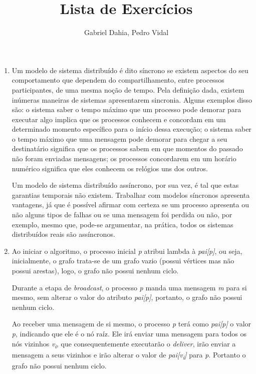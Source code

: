 \documentclass{article}
\title{Lista de Exercícios}
\author{Gabriel Dahia, Pedro Vidal}
\begin{document}
 
\maketitle
 
\begin{enumerate}

\item
    Um modelo de sistema distribuído é dito síncrono se existem aspectos do seu comportamento que dependem do compartilhamento, entre processos participantes, de uma mesma noção de tempo.
    Pela definição dada, existem inúmeras maneiras de sistemas apresentarem sincronia.
    Alguns exemplos disso são: o sistema saber o tempo máximo que um processo pode demorar para executar algo implica que os processos conhecem e concordam em um determinado momento específico para o início dessa execução; o sistema saber o tempo máximo que uma mensagem pode demorar para chegar a seu destinatário significa que os processos sabem em que momentos do passado não foram enviadas mensagens; os processos concordarem em um horário numérico significa que eles conhecem os relógios uns dos outros.
    
    Um modelo de sistema distribuído assíncrono, por sua vez, é tal que estas garantias temporais não existem.
    Trabalhar com modelos síncronos apresenta vantagens, já que é possível afirmar com certeza se um processo apresenta ou não alguns tipos de falhas ou se uma mensagem foi perdida ou não, por exemplo, mesmo que, pode-se argumentar, na prática, todos os sistemas distribuídos reais são assíncronos.

\item Ao iniciar o algoritmo, o processo inicial \textit{p} atribui lambda à \textit{pai[p]}, ou seja, inicialmente, o grafo trata-se de um grafo vazio (possui vértices mas não possui arestas), logo, o grafo não possui nenhum ciclo.

Durante a etapa de \textit{broadcast}, o processo \textit{p} manda uma mensagem \textit{m} para si mesmo, sem alterar o valor do atributo \textit{pai[p]}, portanto, o grafo não possui nenhum ciclo.

Ao receber uma mensagem de si mesmo, o processo \textit{p} terá como \textit{pai[p]} o valor \textit{p}, indicando que ele é o nó raíz. Ele irá enviar uma mensagem para todos os nós vizinhos \textit{v\textsubscript{i}}, que consequentemente executarão o \textit{deliver}, irão enviar a mensagem a seus vizinhos e irão alterar o valor de \textit{pai[\textit{v\textsubscript{i}}]} para \textit{p}. Portanto o grafo não possui nenhum ciclo.


\end{enumerate}
\end{document}
